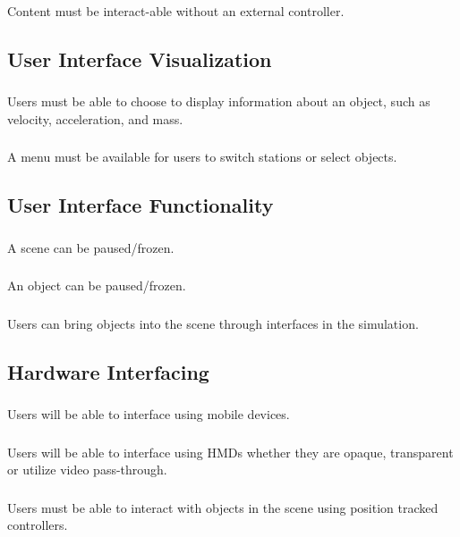 \documentclass[onecolumn, draftclsnofoot,10pt, compsoc]{IEEEtran}
\begin{document}
Content must be interact-able without an external controller.

\subsection{User Interface Visualization}
\subsubsection{}
Users must be able to choose to display information about an object, such as velocity, acceleration, and mass.
\subsubsection{}
A menu must be available for users to switch stations or select objects.
\subsection{User Interface Functionality}
\subsubsection{}
A scene can be paused/frozen.
\subsubsection{}
An object can be paused/frozen.
\subsubsection{}
Users can bring objects into the scene through interfaces in the simulation.

\subsection{Hardware Interfacing}
\subsubsection{}
Users will be able to interface using mobile devices.
\subsubsection{}
Users will be able to interface using HMDs whether they are opaque, transparent or utilize video pass-through.
\subsubsection{}
Users must be able to interact with objects in the scene using position tracked controllers.
\end{document}
